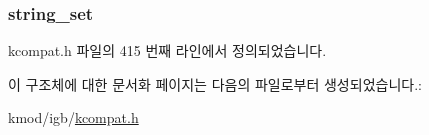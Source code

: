 \subsubsection[{\texorpdfstring{string\+\_\+set}{string_set}}]{ string\+\_\+set}\hypertarget{structethtool__gstrings_a3874391cf16ebd5fe55ee6de9871d873}{}\label{structethtool__gstrings_a3874391cf16ebd5fe55ee6de9871d873}


kcompat.\+h 파일의 415 번째 라인에서 정의되었습니다.



이 구조체에 대한 문서화 페이지는 다음의 파일로부터 생성되었습니다.\+:\begin{DoxyCompactItemize}
\item 
kmod/igb/\hyperlink{kcompat_8h}{kcompat.\+h}\end{DoxyCompactItemize}
